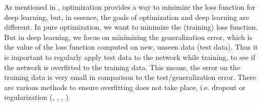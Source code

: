 \documentclass[12pt,DIV14,BCOR12mm,a4paper,footexclude,headinclude,halfparskip-,twoside,openright,cleardoubleempty,idxtotoc,bibtotoc,listtotoc]{scrreprt} %
\numberwithin{equation}{chapter}
\begin{document}
As mentioned in \cite{DeepLearningDive}, optimization provides a way to minimize the loss function for deep learning, but, in essence, the goals of optimization and deep learning are different. In pure optimization, we want to minimize the (training) loss function. But in deep learning, we focus on minimizing the generalization error, which is the value of the loss function computed on new, unseen data (test data). Thus it is important to regularly apply test data to the network while training, to see if the network is overfitted to the training data. This means, the error on the training data is very small in comparison to the test/generalization error. There are various methods to ensure overfitting does not take place, i.e. dropout or regularization (\cite{Goodfellow-et-al-2016}, \cite{Nielsen-Michael}, \cite{DeepLearningDive}, \cite{Bishop}).\\
\end{document}
